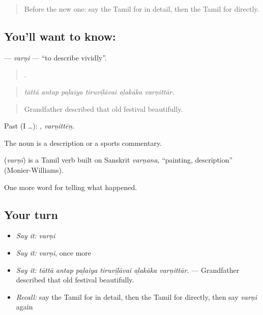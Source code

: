 \label{lesson:TA-C312-varni}



\begin{quote}
Before the new one: say the Tamil for in detail, then the Tamil for directly.
\end{quote}

\subsection*{You'll want to know: }
\textbf{} — \emph{varṇi} — \textquotedblleft{}to describe vividly\textquotedblright{}.

\begin{quote}
     .
\end{quote}

\begin{quote}
\emph{tāttā antap paḻaiya tiruviḻāvai aḻakāka varṇittār.}
\end{quote}

\begin{quote}
Grandfather described that old festival beautifully.
\end{quote}

Past (I …): , \emph{varṇittēṉ}.

The noun  is a description or a sports commentary.

\begin{cousinweb}
\textbf{} (\emph{varṇi}) is a Tamil verb built on Sanskrit \emph{varṇana}, \textquotedblleft{}painting, description\textquotedblright{} (Monier-Williams).
\end{cousinweb}

\begin{grammarlens}[title={What you've built}]
One more word for telling what happened.
\end{grammarlens}

\subsection*{Your turn}
\begin{itemize}
\raggedright
  \item \emph{Say it:} \emph{varṇi}
  \item \emph{Say it:} \emph{varṇi}, once more
  \item \emph{Say it:} \emph{tāttā antap paḻaiya tiruviḻāvai aḻakāka varṇittār.} — Grandfather described that old festival beautifully.
  \item \emph{Recall:} say the Tamil for in detail, then the Tamil for directly, then say \emph{varṇi} again
\end{itemize}

